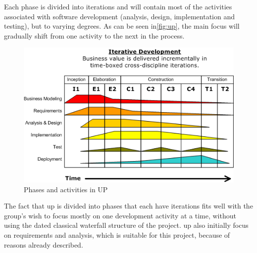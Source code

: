Each phase is divided into iterations and will contain most of the activities associated with software development (analysis, design, implementation and testing), but to varying degrees. As can be seen in\autoref{fig:up}, the main focus will gradually shift from one activity to the next in the process.

\begin{figure}[h]
  \centering
    \includegraphics[width=\textwidth]{img/Development-iterative.png}
  \caption{Phases and activities in UP}
  \label{fig:up}
\end{figure}


The fact that \ac{up} is divided into phases that each have iterations fits well with the group's wish to focus mostly on one development activity at a time, without using the dated classical waterfall structure of the project. \ac{up} also initially focus on requirements and analysis, which is suitable for this project, because of reasons already described.\newline

